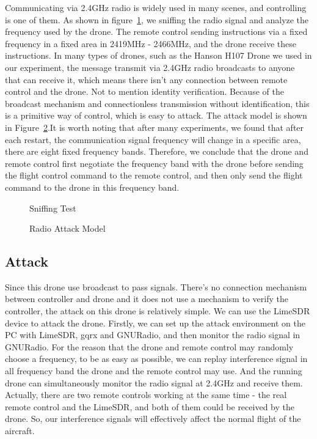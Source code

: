 \documentclass{acm_proc_article-sp}
\begin{document}
Communicating via 2.4GHz radio is widely used in many scenes, and controlling is one of them. As shown in figure~\ref{sniff}, we sniffing the radio signal and analyze the frequency used by the drone. The remote control sending instructions via a fixed frequency in a fixed area in 2419MHz - 2466MHz, and the drone receive these instructions. In many types of drones, such as the Hanson H107 Drone we used in our experiment, the message transmit via 2.4GHz radio broadcasts to anyone that can receive it, which means there isn't any connection between remote control and the drone. Not to mention identity verification. Because of the broadcast mechanism and connectionless transmission without identification, this is a primitive way of control, which is easy to attack. The attack model is shown in Figure~\ref{radio}.It is worth noting that after many experiments, we found that after each restart, the communication signal frequency will change in a specific area, there are eight fixed frequency bands. Therefore, we conclude that the drone and remote control first negotiate the frequency band with the drone before sending the flight control command to the remote control, and then only send the flight command to the drone in this frequency band.

\begin{figure}
\centering
{}
\caption{Sniffing Test}
\label{sniff}
\end{figure}

\begin{figure}
\centering
{}
\caption{Radio Attack Model}
\label{radio}
\end{figure}

\subsection{Attack}


Since this drone use broadcast to pass signals. There's no connection mechanism between controller and drone and it does not use a mechanism to verify the controller, the attack on this drone is relatively simple. We can use the LimeSDR device to attack the drone. Firstly, we can set up the attack environment on the PC with LimeSDR, gqrx and GNURadio, and then monitor the radio signal in GNURadio. For the reason that the drone and remote control may randomly choose a frequency, to be as easy as possible, we can replay interference signal in all frequency band the drone and the remote control may use. And the running drone can simultaneously monitor the radio signal at 2.4GHz and receive them. Actually, there are two remote controls working at the same time - the real remote control and the LimeSDR, and both of them could be received by the drone. So, our interference signals will effectively affect the normal flight of the aircraft.
\end{document}
